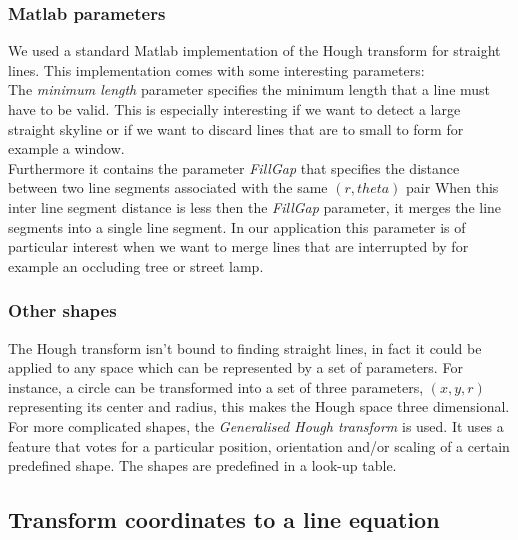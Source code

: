 \subsubsection{Matlab parameters}
We used a standard Matlab implementation of the Hough transform for straight lines.  This implementation comes with some interesting parameters:\\

	The \emph{minimum length} parameter specifies the minimum length that a line must have to be valid. This is especially interesting if we want to detect a large straight skyline or if we want to discard lines that are to small to form for example a window.\\

	Furthermore it contains the parameter \emph{FillGap} that specifies the distance
	between two line segments associated with the same $(r, theta)$ pair
	When this inter line segment distance is less then the \emph{FillGap} parameter, it merges the line segments into a single line segment. In our application this parameter is of particular interest when we want to merge lines that are interrupted by for example an occluding tree or street lamp.\\


\subsubsection{Other shapes}
The Hough transform isn't bound to finding straight lines, in fact it could be
applied to any space which can be represented by a set of parameters.  For
instance, a circle can be transformed into a set of three parameters, $(x,y,r)$
representing its center and radius, this makes the Hough space three
dimensional. 
For more complicated shapes, the 
\emph{Generalised Hough transform} is used.
It uses a feature that votes for a particular position, orientation and/or scaling of a certain predefined shape.  The shapes are predefined in a look-up table.





\subsection{Transform coordinates to a line equation}
\label{sec:lineeq}


